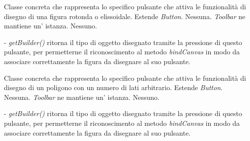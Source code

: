 Classe concreta che rappresenta lo specifico pulsante che attiva le funzionalit\` a di disegno di una figura rotonda o elissoidale.
Estende \textit{Button}.
Nessuna.
\textit{Toolbar} ne mantiene un' istanza.
Nessuno.
\begin{elencopuntato}[\subsubsecindent]
\item[-] \textit{getBuilder()} ritorna il tipo di oggetto disegnato tramite la pressione di questo pulsante, per permetterne il riconoscimento al metodo \textit{bindCanvas} in modo da associare correttamente la figura da disegnare al suo pulsante.
\end{elencopuntato}

Classe concreta che rappresenta lo specifico pulsante che attiva le funzionalit\` a di disegno di un poligono con un numero di lati arbitrario.
Estende \textit{Button}.
Nessuna.
\textit{Toolbar} ne mantiene un' istanza.
Nessuno.
\begin{elencopuntato}[\subsubsecindent]
\item[-] \textit{getBuilder()} ritorna il tipo di oggetto disegnato tramite la pressione di questo pulsante, per permetterne il riconoscimento al metodo \textit{bindCanvas} in modo da associare correttamente la figura da disegnare al suo pulsante.
\end{elencopuntato}

